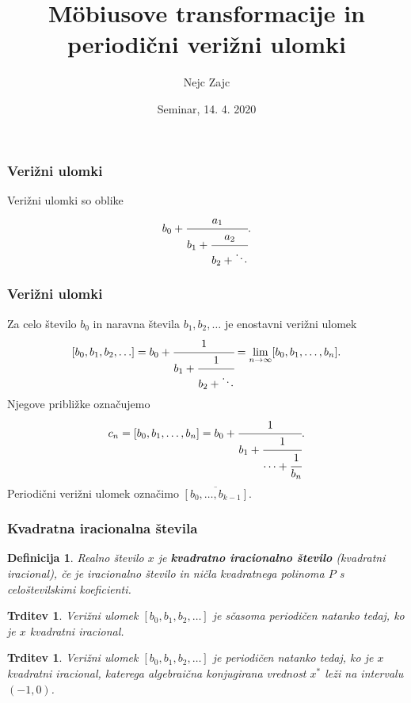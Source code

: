 \documentclass{beamer}
\title{M\"obiusove transformacije in periodični verižni ulomki}
\author[Nejc Zajc]{Nejc Zajc}
\date{Seminar, 14. 4. 2020}
\newtheorem{trditev}[theorem]{Trditev}
\newtheorem{definicija}{Definicija}
\begin{document}
\begin{frame}
\maketitle

\end{frame}

\begin{frame}
\frametitle{Verižni ulomki}
Verižni ulomki so oblike
\[
    b_0 + \cfrac{a_1}{b_1 + \cfrac{a_2}{b_2 + \ddots}}.
\]  

\end{frame}
\begin{frame}
\frametitle{Verižni ulomki}
Za celo število $b_0$ in naravna števila $b_1, b_2, \ldots$ je enostavni verižni ulomek 
\[
    [b_0, b_1, b_2, \ldots] = b_0 + \cfrac{1}{b_1 + \cfrac{1}{b_2 + \ddots}} = \lim_{n \to \infty} [b_0, b_1, \ldots, b_n].
\]
Njegove približke označujemo
\[
    c_n = [b_0, b_1, \ldots, b_n] = b_0 + \cfrac{1}{b_1 + \cfrac{1}{\cdots + \cfrac{1}{b_n}}}.
\]
\pause
Periodični verižni ulomek označimo $\overline{[b_0, \ldots, b_{k-1}]}$.





\end{frame}
\begin{frame}
\frametitle{Kvadratna iracionalna števila}
\begin{definicija}
    Realno število $x$ je \textbf{kvadratno iracionalno število} (kvadratni iracional), če je iracionalno število in ničla kvadratnega polinoma $P$ s celoštevilskimi koeficienti.
\end{definicija}
\pause
\begin{trditev}
    Verižni ulomek $[b_0, b_1, b_2, \ldots]$ je sčasoma periodičen natanko tedaj, ko je $x$ kvadratni iracional.
\end{trditev}
\pause
\begin{trditev}
    Verižni ulomek $[b_0, b_1, b_2, \ldots]$ je periodičen natanko tedaj, ko je $x$ kvadratni iracional, katerega algebraična konjugirana vrednost $x^*$ leži na intervalu $(-1, 0)$.
\end{trditev} 




\end{frame}
\end{document}
